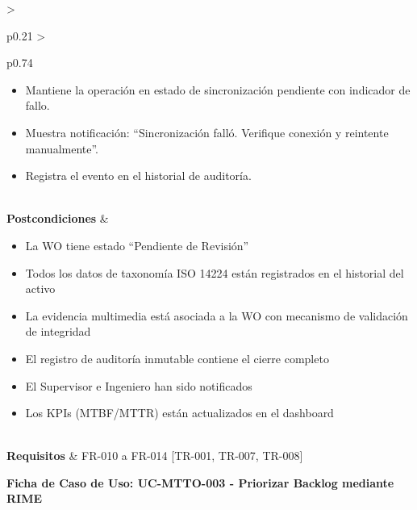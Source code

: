 \begin{longtable}{>{\raggedright\arraybackslash}p{0.21\textwidth} >{\raggedright\arraybackslash}p{0.74\textwidth}}
{\begin{enumerate}[leftmargin=1.5em, nosep, topsep=0pt]
\begin{itemize}[leftmargin=1.2em, nosep, topsep=0pt]
\item Mantiene la operación en estado de sincronización pendiente con indicador de fallo.
\item Muestra notificación: ``Sincronización falló. Verifique conexión y reintente manualmente''.
\item Registra el evento en el historial de auditoría.
\end{itemize}
\end{enumerate} \vspace{2pt}} \\
\textbf{Postcondiciones} & \parbox[t]{\linewidth}{\vspace{2pt} \begin{itemize}[leftmargin=1.5em, nosep, topsep=0pt]
\item La WO tiene estado ``Pendiente de Revisión''
\item Todos los datos de taxonomía ISO 14224 están registrados en el historial del activo
\item La evidencia multimedia está asociada a la WO con mecanismo de validación de integridad
\item El registro de auditoría inmutable contiene el cierre completo
\item El Supervisor e Ingeniero han sido notificados
\item Los KPIs (MTBF/MTTR) están actualizados en el dashboard
\end{itemize} \vspace{2pt}} \\
\textbf{Requisitos} & FR-010 a FR-014 [TR-001, TR-007, TR-008] \\ \bottomrule
\end{longtable}\normalsize\vspace{1em}
\noindent\textbf{Ficha de Caso de Uso: UC-MTTO-003 - Priorizar Backlog mediante RIME}
\footnotesize\setlength{\tabcolsep}{4pt}\renewcommand{\arraystretch}{1.2}
